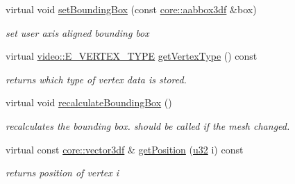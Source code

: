 \begin{DoxyCompactItemize}
virtual void \hyperlink{structirr_1_1scene_1_1SSharedMeshBuffer_a54e11fd284245c3f5e5e07145ad4a202}{set\+Bounding\+Box} (const \hyperlink{namespaceirr_1_1core_a60f4b4c744aba55f10530d503c6ecb04}{core\+::aabbox3df} \&box)
\begin{DoxyCompactList}\small\item\em set user axis aligned bounding box \end{DoxyCompactList}\item 
\mbox{\label{structirr_1_1scene_1_1SSharedMeshBuffer_af6e2e8a103a2c0713d5a090d92a4edb6}} 
virtual \hyperlink{namespaceirr_1_1video_a0e3b59e025e0d0db0ed2ee0ce904deac}{video\+::\+E\+\_\+\+V\+E\+R\+T\+E\+X\+\_\+\+T\+Y\+PE} \hyperlink{structirr_1_1scene_1_1SSharedMeshBuffer_af6e2e8a103a2c0713d5a090d92a4edb6}{get\+Vertex\+Type} () const
\begin{DoxyCompactList}\small\item\em returns which type of vertex data is stored. \end{DoxyCompactList}\item 
\mbox{\label{structirr_1_1scene_1_1SSharedMeshBuffer_a1425de91a910751d0e7fc8b8dca636e9}} 
virtual void \hyperlink{structirr_1_1scene_1_1SSharedMeshBuffer_a1425de91a910751d0e7fc8b8dca636e9}{recalculate\+Bounding\+Box} ()
\begin{DoxyCompactList}\small\item\em recalculates the bounding box. should be called if the mesh changed. \end{DoxyCompactList}\item 
\mbox{\label{structirr_1_1scene_1_1SSharedMeshBuffer_ad0b4d04e67c39d2dab9900bdfce6b474}} 
virtual const \hyperlink{namespaceirr_1_1core_ae6e2b2a6c552833ebbd5b7463d03586b}{core\+::vector3df} \& \hyperlink{structirr_1_1scene_1_1SSharedMeshBuffer_ad0b4d04e67c39d2dab9900bdfce6b474}{get\+Position} (\hyperlink{namespaceirr_a0416a53257075833e7002efd0a18e804}{u32} i) const
\begin{DoxyCompactList}\small\item\em returns position of vertex i \end{DoxyCompactList}\item 
\mbox{\label{structirr_1_1scene_1_1SSharedMeshBuffer_a3a9d00d4a52471083a21ed18a8ce7729}} 

\end{DoxyCompactItemize}

